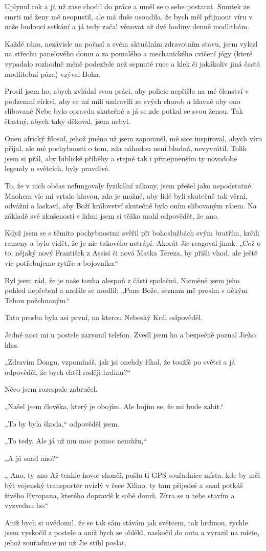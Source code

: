 Uplynul rok a já už zase chodil do práce a uměl se o sebe postarat. Smutek ze smrti mé ženy mě neopustil, ale má duše usoudila, že bych měl přijmout víru v naše budoucí setkání a já tedy začal věnovat až dvě hodiny denně modlitbám.

Každé ráno, nezávisle na počasí a svém aktuálním zdravotním stavu, jsem vylezl na střechu panelového domu a za pomalého a mechanického cvičení jógy (které vypadalo rozhodně méně podezřele než sepnuté ruce a klek či jakákoliv jiná častá modlitební póza) vzýval Boha.

Prosil jsem ho, abych zvládal svou práci, aby policie nepřišla na mé členství v podzemní církvi, aby se mí milí uzdravili ze svých chorob a hlavně aby ono slibované Nebe bylo opravdu skutečné a já se zde potkal se svou ženou. Tak šťastný, abych taky děkoval, jsem nebyl.

Onen africký filosof, jehož jméno už jsem zapomněl, mě sice inspiroval, abych víru přijal, ale mé pochybnosti o tom, zda náhodou není bludná, nevyvrátil. Tolik jsem si přál, aby biblické příběhy a stejně tak i přinejmenším ty novodobé legendy o světcích, byly pravdivé. 

To, že v nich občas nefungovaly fyzikální zákony, jsem přešel jako nepodstatné. Mnohem víc mi vrtalo hlavou, zda je možné, aby lidé byli skutečně tak věrní, odvážní a laskaví, aby Boží království skutečně bylo oním slibovaným rájem. Na základě své zkušenosti s lidmi jsem si těžko mohl odpovědět, že ano.

Když jsem se s těmito pochybnostmi svěřil při bohoslužbách svým bratřím, krčili rameny a bylo vidět, že je nic takového netrápí. Akorát Jie reagoval jinak: „Což o to, nějaký nový František z Assisi či nová Matka Tereza, by přišli vhod, ale ještě víc potřebujeme rytíře a bojovníka.“

Byl jsem rád, že je naše touha alespoň z části společná. Nicméně jsem jeho pohled nepřebral a nadále se modlil: „Pane Bože, seznam mě prosím s někým Tebou požehnaným.“

Tato prosba byla asi první, na kterou Nebeský Král odpověděl.

Jedné noci mi u postele zazvonil telefon. Zvedl jsem ho a bezpečně poznal Jieho hlas.

„Zdravím Dongu, vzpomínáš, jak jsi onehdy říkal, že toužíš po světci a já odpověděl, že bych chtěl raději hrdinu?“

Něco jsem rozespale zabručel.

„Našel jsem člověka, který je obojím. Ale bojím se, že mi bude zabit.“

„To by byla škoda,“ odpověděl jsem.

„To tedy. Ale já už mu moc pomoc nemůžu,“

„A já snad ano?“

„ Ano, ty ano Až tenhle hovor skončí, pošlu ti GPS souřadnice místa, kde by měl být vojenský transportér uvízlý v řece Xiliao, ty tam přijedeš a snad potkáš živého Evropana, kterého dopravíš k sobě domů. Zítra se u tebe stavím a vyzvednu ho.“

Aniž bych si uvědomil, že se tak sám stávám jak světcem, tak hrdinou, rychle jsem vyskočil z postele a aniž bych se oblékl, naskočil do auta a vyrazil na místo, jehož souřadnice mi už Jie stihl poslat.
